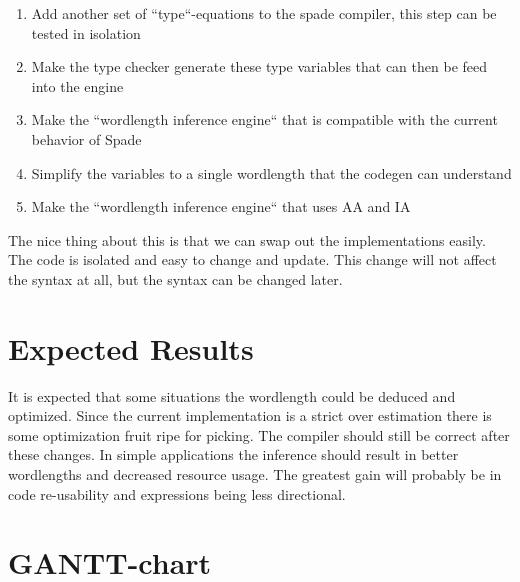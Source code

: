\documentclass[msc,lith,english]{liuthesis}
\begin{document}
\begin{enumerate}
    \item Add another set of ``type``-equations to the spade compiler, this step can be tested in isolation
    \item Make the type checker generate these type variables that can then be feed into the engine
    \item Make the ``wordlength inference engine`` that is compatible with the current behavior of Spade
    \item Simplify the variables to a single wordlength that the codegen can understand
    \item Make the ``wordlength inference engine`` that uses AA and IA
\end{enumerate}

The nice thing about this is that we can swap out the implementations easily. The code is isolated and easy to change and update. This change will not affect the syntax at all, but the syntax can be changed later.

\section{Expected Results}
It is expected that some situations the wordlength could be deduced and optimized. Since the current implementation is a strict over estimation there is some optimization fruit ripe for picking. The compiler should still be correct after these changes. In simple applications the inference should result in better wordlengths and decreased resource usage. The greatest gain will probably be in code re-usability and expressions being less directional.

\newpage
\section{GANTT-chart}
\end{document}
